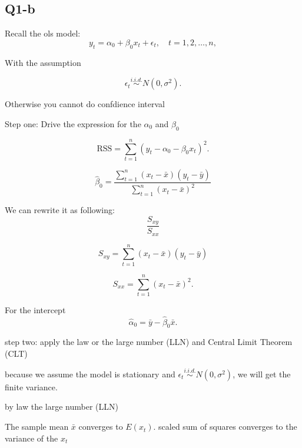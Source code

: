 \documentclass{article} %
\begin{document}
\subsection*{Q1-b}


Recall the ols model:
\begin{equation}
 y_t = \alpha_0 + \beta_0 x_t + \epsilon_t, \quad t = 1,2,\dots,n,
\end{equation}

With the assumption 

\begin{equation}
 \epsilon_t \overset{i.i.d.}{\sim} N(0,\sigma^2).
\end{equation}

Otherwise you cannot do confdience interval

Step one: Drive the expression for the $\alpha_0$ and $\beta_0$

\begin{equation}
 \text{RSS} = \sum_{t=1}^n \left(y_t - \alpha_0 - \beta_0 x_t\right)^2.
\end{equation}

\begin{equation}
 \hat{\beta}_0 = \frac{\sum_{t=1}^n (x_t - \bar{x})(y_t - \bar{y})}{\sum_{t=1}^n (x_t - \bar{x})^2} 
\end{equation}

We can rewrite it as following: 
\begin{equation}
\frac{S_{xy}}{S_{xx}}
\end{equation}

\begin{equation}
 S_{xy} = \sum_{t=1}^n (x_t - \bar{x})(y_t - \bar{y})
\end{equation}

\begin{equation}
 S_{xx} = \sum_{t=1}^n (x_t - \bar{x})^2.
\end{equation}

For the intercept
\begin{equation}
 \hat{\alpha}_0 = \bar{y} - \hat{\beta}_0 \bar{x}.
\end{equation}


step two: apply the law or the large number (LLN) and Central Limit Theorem (CLT)

because we assume the model is stationary and $ \epsilon_t \overset{i.i.d.}{\sim} N(0,\sigma^2) $, we will get the finite variance.

by law the large number (LLN)

The sample mean $\bar{x}$ converges to $E(x_t)$. 
scaled sum of squares converges to the variance of the $x_t$
\end{document}
